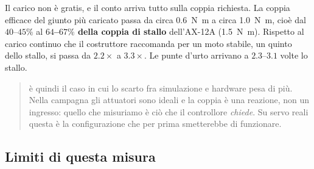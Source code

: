 Il carico non è gratis, e il conto arriva tutto sulla coppia richiesta. La
coppia efficace del giunto più caricato passa da circa \SI{0.6}{\newton\meter}
a circa \SI{1.0}{\newton\meter}, cioè dal $40$--$45\%$ al \textbf{$64$--$67\%$
della coppia di stallo} dell'AX-12A (\SI{1.5}{\newton\meter}). Rispetto al
carico continuo che il costruttore raccomanda per un moto stabile, un quinto
dello stallo, si passa da $2.2\times$ a $3.3\times$. Le punte d'urto arrivano
a $2.3$--$3.1$ volte lo stallo.

\begin{quote}
\Cthp{} è quindi il caso in cui lo scarto fra simulazione e hardware pesa di
più. Nella campagna gli attuatori sono ideali e la coppia è una reazione, non
un ingresso: quello che misuriamo è ciò che il controllore \emph{chiede}. Su
servo reali questa è la configurazione che per prima smetterebbe di
funzionare.
\end{quote}

\subsection{Limiti di questa misura}

